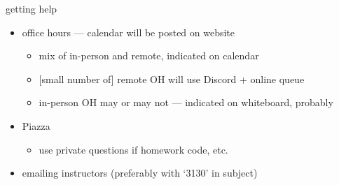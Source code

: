 \begin{frame}{getting help}
    \begin{itemize}
    \item office hours --- calendar will be posted on website
        \begin{itemize}
        \item mix of in-person and remote, indicated on calendar
        \item{} [small number of] remote OH will use Discord + online queue
        \item in-person OH may or may not --- indicated on whiteboard, probably
        \end{itemize}
    \item Piazza
        \begin{itemize}
        \item use private questions if homework code, etc.
        \end{itemize}
    \item emailing instructors (preferably with `3130' in subject)
    \end{itemize}
\end{frame}
